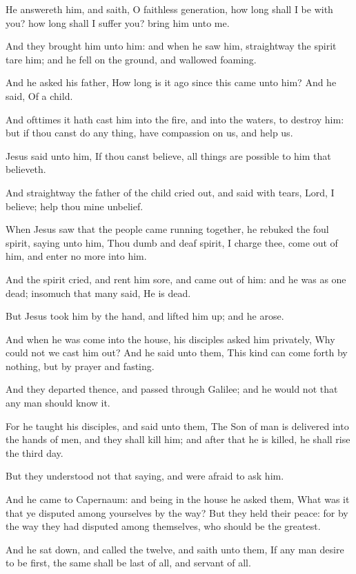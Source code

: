 \Verse He answereth him, and saith, O faithless generation, how long shall I be with you? how long shall I suffer you? bring him unto me.

\Verse And they brought him unto him: and when he saw him, straightway the spirit tare him; and he fell on the ground, and wallowed foaming.

\Verse And he asked his father, How long is it ago since this came unto him?  And he said, Of a child.

\Verse And ofttimes it hath cast him into the fire, and into the waters, to destroy him: but if thou canst do any thing, have compassion on us, and help us.

\Verse Jesus said unto him, If thou canst believe, all things are possible to him that believeth.

\Verse And straightway the father of the child cried out, and said with tears, Lord, I believe; help thou mine unbelief.

\Verse When Jesus saw that the people came running together, he rebuked the foul spirit, saying unto him, Thou dumb and deaf spirit, I charge thee, come out of him, and enter no more into him.

\Verse And the spirit cried, and rent him sore, and came out of him: and he was as one dead; insomuch that many said, He is dead.

\Verse But Jesus took him by the hand, and lifted him up; and he arose.

\Verse And when he was come into the house, his disciples asked him privately, Why could not we cast him out?  \Verse And he said unto them, This kind can come forth by nothing, but by prayer and fasting.

\Verse And they departed thence, and passed through Galilee; and he would not that any man should know it.

\Verse For he taught his disciples, and said unto them, The Son of man is delivered into the hands of men, and they shall kill him; and after that he is killed, he shall rise the third day.

\Verse But they understood not that saying, and were afraid to ask him.

\Verse And he came to Capernaum: and being in the house he asked them, What was it that ye disputed among yourselves by the way?  \Verse But they held their peace: for by the way they had disputed among themselves, who should be the greatest.

\Verse And he sat down, and called the twelve, and saith unto them, If any man desire to be first, the same shall be last of all, and servant of all.


